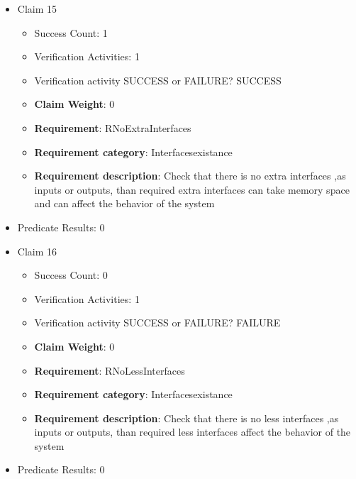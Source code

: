\documentclass{article}
\begin{document}
\begin{itemize}
  				  \item Claim 15
				\begin{itemize}
			    	\item Success Count: 1 
			    	\item Verification Activities: 1
					\item Verification activity SUCCESS or FAILURE? SUCCESS
					\item \textbf{Claim Weight}: 0
						\item \textbf{Requirement}: RNoExtraInterfaces 
						\item \textbf{Requirement category}: Interfacesexistance 
						\item \textbf{Requirement description}: Check that there is no extra interfaces ,as inputs or outputs, than required  extra interfaces can take memory space and can affect the behavior of the system
					
				\end{itemize}
				
									    
				\item Predicate Results: 0

  				  \item Claim 16
				\begin{itemize}
			    	\item Success Count: 0 
			    	\item Verification Activities: 1
					\item Verification activity SUCCESS or FAILURE? FAILURE
					\item \textbf{Claim Weight}: 0
						\item \textbf{Requirement}: RNoLessInterfaces 
						\item \textbf{Requirement category}: Interfacesexistance 
						\item \textbf{Requirement description}: Check that there is no less interfaces ,as inputs or outputs, than required  less interfaces affect the behavior of the system
					
				\end{itemize}
				
									    
				\item Predicate Results: 0


\end{itemize}
\end{document}
